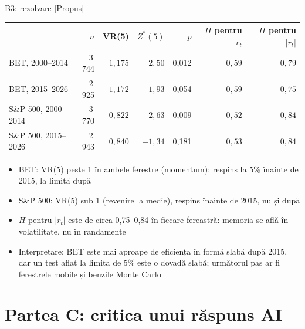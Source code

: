 \ifsolutions
\begin{frame}{B3: rezolvare [Propus]}
\itemsize{\footnotesize}
\begin{center}
\scriptsize
\begin{tabular}{lrrrrrr}
\toprule
& $n$ & VR(5) & $Z^*(5)$ & $p$ & $H$ pentru $r_t$ & $H$ pentru $|r_t|$ \\
\midrule
BET, 2000--2014 & 3\,744 & ${1{,}175}$ & ${2{,}50}$ & 0{,}012 & ${0{,}59}$ & ${0{,}79}$ \\
BET, 2015--2026 & 2\,925 & ${1{,}172}$ & ${1{,}93}$ & 0{,}054 & ${0{,}59}$ & ${0{,}75}$ \\
S\&P 500, 2000--2014 & 3\,770 & ${0{,}822}$ & ${-2{,}63}$ & 0{,}009 & ${0{,}52}$ & ${0{,}84}$ \\
S\&P 500, 2015--2026 & 2\,943 & ${0{,}840}$ & ${-1{,}34}$ & 0{,}181 & ${0{,}53}$ & ${0{,}84}$ \\
\bottomrule
\end{tabular}
\end{center}
\begin{itemize}
    \item BET: VR(5) peste 1 în ambele ferestre (momentum); respins la 5\% înainte de 2015, la limită după
    \item S\&P 500: VR(5) sub 1 (revenire la medie), respins înainte de 2015, nu și după
    \item $H$ pentru $|r_t|$ este de circa 0,75--0,84 în fiecare fereastră: memoria se află în volatilitate, nu în randamente
    \item Interpretare: BET este mai aproape de eficiența în formă slabă după 2015, dar un test aflat la limita de 5\% este o dovadă slabă; următorul pas ar fi ferestrele mobile și benzile Monte Carlo
\end{itemize}
\end{frame}
\fi


\section{Partea C: critica unui răspuns AI}

